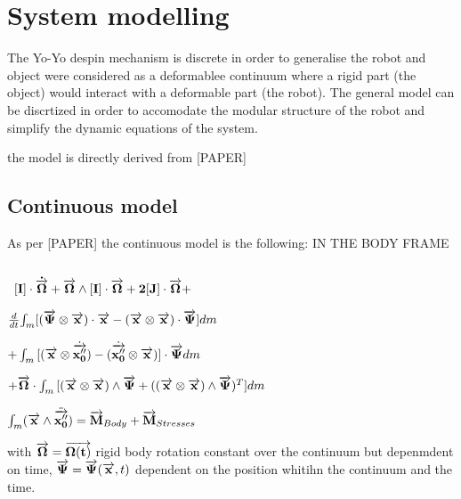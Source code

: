 \section{System modelling}
\label{System modelling}
The Yo-Yo despin mechanism is discrete in order to generalise the robot and object were considered as a deformablee continuum where a rigid part (the object) would interact with a deformable part (the robot). The general model can be discrtized in order to accomodate the modular structure of the robot and simplify the dynamic equations of the system.

the model is directly derived from [PAPER]
\subsection{Continuous model}
\label{Continuous model}

As per [PAPER] the continuous model is the following: IN THE BODY FRAME
\begin{center}
\begin{equation*} 
\end{equation*}
\end{center}\
$[\bf I]\cdot \dot{\overrightarrow{\bf \Omega}} + \overrightarrow{\bf \Omega} \wedge [\bf I]\cdot \overrightarrow{\bf \Omega} + 2[\bf J]\cdot \overrightarrow{\bf \Omega}+ $

${d\over dt}{\int_{m}[(\overrightarrow{\bf \Psi} \otimes \overrightarrow{\bf x})\cdot \overrightarrow{\bf x} - (\overrightarrow{\bf x}\otimes\overrightarrow{\bf x})\cdot \overrightarrow{\bf \Psi}]dm}$



$+ \int_{m}{[(\overrightarrow{\bf x}\otimes \dot{\overrightarrow{\bf x''_{0}}}) - (\dot{\overrightarrow{\bf x''_{0}}}\otimes \overrightarrow{\bf x}) ]\cdot \overrightarrow{\bf \Psi}dm}$

$+\overrightarrow{\bf \Omega}\cdot \int_{m}{[(\overrightarrow{\bf x}\otimes \overrightarrow{\bf x})\wedge \overrightarrow{\bf \Psi}+((\overrightarrow{\bf x}\otimes \overrightarrow{\bf x})\wedge \overrightarrow{\bf \Psi})^{T}]dm}$

$\int_{m}(\overrightarrow{\bf x}\wedge \ddot{\overrightarrow{\bf x''_{0}}})
=\overrightarrow{\bf M}_{Body} + \overrightarrow{\bf M}_{Stresses}$




with $\overrightarrow{\bf \Omega}=\overrightarrow{\bf \Omega(t)}$ rigid body rotation constant over the continuum but depenmdent on time, $\overrightarrow{\bf \Psi}=\overrightarrow{\bf \Psi}(\overrightarrow{\bf x},t)$ dependent on the position whitihn the continuum and the time. 


